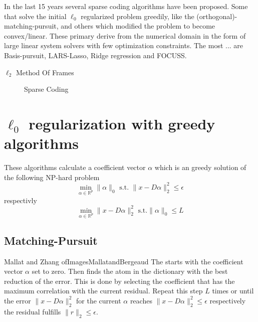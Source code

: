 In the last 15 years several sparse coding algorithms have been proposed. Some
that solve the initial $\ell_0$ regularized problem greedily, like
the (orthogonal)-matching-pursuit, and others which modified the problem to
become convex/linear. These primary derive from the numerical domain in the form
of large linear system solvers with few optimization constraints. The most
... are Basis-pursuit, LARS-Lasso, Ridge regression and FOCUSS.

$\ell_2$ Method Of Frames


\begin{figure}
\centering
\caption{Sparse Coding}
\label{fig:da_x}
\end{figure}




\section{$\ell_0$ regularization with greedy algorithms}
These algorithms calculate a coefficient vector $\alpha$ which is an
greedy solution of the following NP-hard problem
\begin{equation}
\min_{\alpha\in\mathbb{R}^{p}}   \lVert \alpha \rVert_{0}   \textrm{ s.t. }
\lVert x - D\alpha \rVert^{2}_{2} \leq \epsilon
\end{equation}
respectivly
\begin{equation}
\min_{\alpha\in\mathbb{R}^{p}}  \lVert x - D\alpha \rVert^{2}_{2} \textrm{ s.t.
} \lVert \alpha \rVert_{0} \leq L
\end{equation}
\cite{Mallat1993}

\subsection{Matching-Pursuit}
\label{sec:mp}
Mallat and Zhang\cite{Mallat1993}
ofImagesMallatandBergeaud \cite{Mallat1995}
The  starts with the coefficient vector $\alpha$ set to
zero. Then finds the atom in the dictionary with the best reduction of the
error. This is done by selecting the coefficient that has the maximum
correlation with the current residual. Repeat this step $L$ times or until the
error
$\lVert x - D\alpha \rVert^{2}_{2}$ for the current $\alpha$ reaches $\lVert x -
D\alpha \rVert^{2}_{2} \leq \epsilon$ respectively the residual fulfills
$\lVert
r \rVert_2 \leq \epsilon$.


